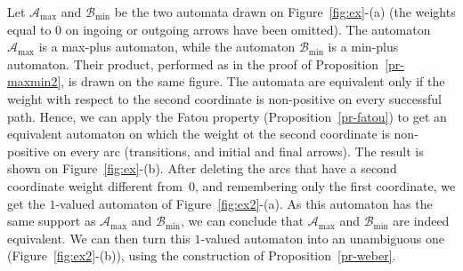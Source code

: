 \documentclass{article}
\def\cA{{\mathcal A}}
\def\cB{{\mathcal B}}
\newcommand{\1}{\mathbb{1}}
\newcommand{\0}{\mathbb{0}}
\begin{document}
Let $\cA_{\max}$ and $\cB_{\min}$ be the two automata drawn on
Figure~\ref{fig:ex}-(a) (the weights equal to 0 on ingoing or outgoing
arrows have been omitted).
The automaton $\cA_{\max}$ is a max-plus automaton, while
the automaton $\cB_{\min}$ is a min-plus automaton. Their product, performed as
in the proof of Proposition~\ref{pr-maxmin2}, is drawn on the same figure.
The automata are equivalent only if the weight with respect to the second coordinate is
non-positive on every successful path. Hence, we can apply the Fatou property
(Proposition~\ref{pr-fatou}) to get an equivalent automaton on which the
weight ot the second coordinate is non-positive on every arc (transitions, and initial
and final arrows). The result is shown on Figure~\ref{fig:ex}-(b). After
deleting the arcs that have a second coordinate weight different
from~$0$, and remembering only the first coordinate, we get the 
$1$-valued automaton of Figure~\ref{fig:ex2}-(a). As this automaton has the
same support as $\cA_{\max}$ and $\cB_{\min}$, we can conclude that
$\cA_{\max}$ and $\cB_{\min}$ are indeed equivalent. We can then turn this
$1$-valued automaton into an unambiguous one (Figure~\ref{fig:ex2}-(b)),
using the construction of Proposition~\ref{pr-weber}.
\end{document}

